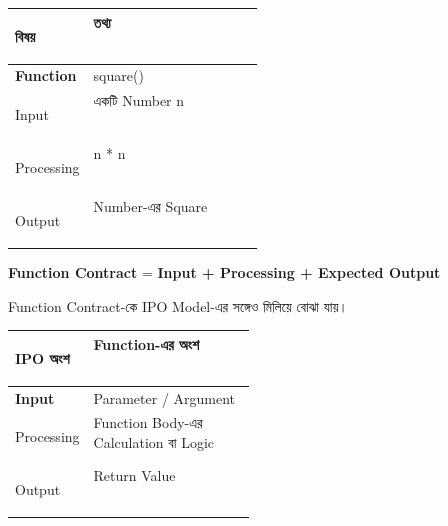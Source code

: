 \begin{tabularx}
{\linewidth}
{
|>{\bfseries\RaggedRight\arraybackslash}p{0.29\linewidth}
|Y|
}

\hline
{}

\textbf{বিষয়}
&
\textbf{তথ্য}
\\
\hline

Function
&
\textenglish{\ttfamily square()}
\\
\hline

Input
&
একটি Number
\textenglish{\ttfamily n}
\\
\hline

Processing
&
\textenglish{\ttfamily n * n}
\\
\hline

Output
&
Number-এর Square
\\
\hline

\end{tabularx}

\begin{rememberbox}

\begin{center}

\textbf{Function Contract}
=
\textbf{Input + Processing + Expected Output}

\end{center}

\end{rememberbox}



Function Contract-কে IPO Model-এর সঙ্গেও মিলিয়ে বোঝা যায়।

\begin{tabularx}
{\linewidth}
{
|>{\bfseries\centering\arraybackslash}p{0.28\linewidth}
|Y|
}

\hline
{}

\textbf{IPO অংশ}
&
\textbf{Function-এর অংশ}
\\
\hline

Input
&
Parameter / Argument
\\
\hline

Processing
&
Function Body-এর Calculation বা Logic
\\
\hline

Output
&
Return Value
\\
\hline

\end{tabularx}

